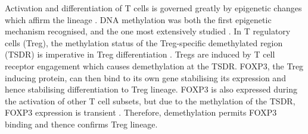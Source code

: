 \documentclass[12pt]{article}
\newcommand{\naive}{na\"{i}ve }
\begin{document}
			
			
			Activation and differentiation of T cells is governed greatly by epigenetic changes which affirm the lineage \citep{Zeng13}.
			DNA methylation was both the first epigenetic mechanism recognised, and the one most extensively studied \citep{Begin14}. 
			In T regulatory cells (Treg), the methylation status of the Treg-specific demethylated region (TSDR) is imperative in Treg differentiation \citep{Polansky08}.
			Tregs are induced by T cell receptor engagement which causes demethylation at the TSDR.
			FOXP3, the Treg inducing protein, can then bind to its own gene stabilising its expression and hence stabilising differentiation to Treg lineage.
			FOXP3 is also expressed during the activation of other T cell subsets, but due to the methylation of the TSDR, FOXP3 expression is transient \citep{Ohkura13}.
			Therefore, demethylation permits FOXP3 binding and thence confirms Treg lineage.
	
%
%		
%			
%		
%	
			
\end{document}
